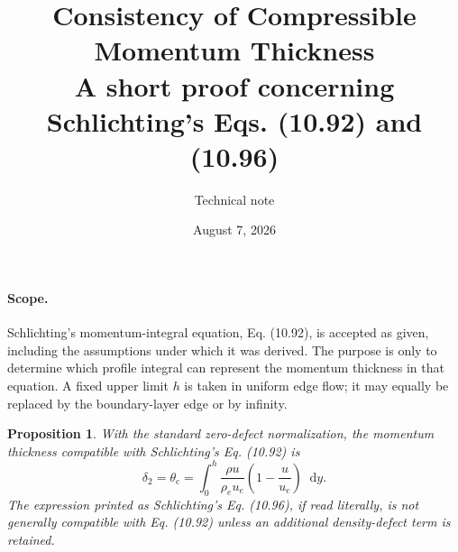 \documentclass[11pt,a4paper]{article}
\title{Consistency of Compressible Momentum Thickness\\
\large A short proof concerning Schlichting's Eqs. (10.92) and (10.96)}
\author{Technical note}
\date{August 7, 2026}
\newcommand{\dd}{\mathop{}\!\mathrm{d}}
\newcommand{\rhoe}{\rho_e}
\newcommand{\ue}{u_e}
\newcommand{\theC}{\theta_{\mathrm c}}
\newtheorem{proposition}{Proposition}
\begin{document}
\maketitle

\paragraph{Scope.}
Schlichting's momentum-integral equation, Eq. (10.92), is accepted as given,
including the assumptions under which it was derived. The purpose is only to
determine which profile integral can represent the momentum thickness in that
equation. A fixed upper limit $h$ is taken in uniform edge flow; it may equally
be replaced by the boundary-layer edge or by infinity.

\begin{proposition}
With the standard zero-defect normalization, the momentum thickness compatible
with Schlichting's Eq. (10.92) is
\begin{equation}
 \boxed{\displaystyle
 \delta_2=\theC=
 \int_0^h\frac{\rho u}{\rhoe\ue}
 \left(1-\frac{u}{\ue}\right)\dd y.}
 \label{eq:conventional}
\end{equation}
The expression printed as Schlichting's Eq. (10.96), if read literally, is not
generally compatible with Eq. (10.92) unless an additional density-defect term
is retained.
\end{proposition}
\end{document}
